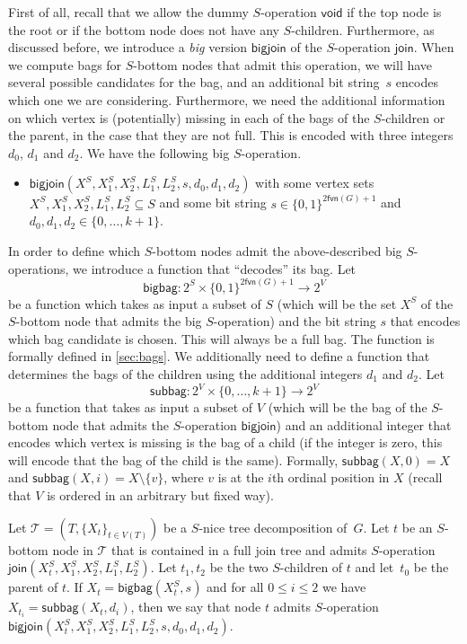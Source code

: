 \documentclass[a4paper,UKenglish,cleveref, autoref, thm-restate, numberwithinsect]{lipics-v2021}
\newcommand{\fvn}{\mathsf{fvn}}
\newcommand{\join}{\mathsf{join}}
\newcommand{\bigjoin}{\mathsf{bigjoin}}
\newcommand{\void}{\mathsf{void}}
\newcommand{\bigbag}{\mathsf{bigbag}}
\newcommand{\subbag}{\mathsf{subbag}}
\newcommand{\slim}{\text{slim}\xspace}
\begin{document}
First of all, recall that we allow the dummy $S$-operation $\void$ if the top node is the root or if the bottom node does not have any $S$-children.
Furthermore, as discussed before, we introduce a \emph{big} version $\bigjoin$ of the $S$-operation $\join$. When we compute bags for $S$-bottom nodes that admit this operation, we will have several possible candidates for the bag, and an additional bit string~$s$ encodes which one we are considering. Furthermore, we need the additional information on which vertex is (potentially) missing in each of the bags of the $S$-children or the parent, in the case that they are not full. This is encoded with three integers $d_0$, $d_1$ and $d_2$. We have the following big $S$-operation.
\begin{itemize}
    \item $\bigjoin(X^S,X_1^S,X_2^S,L_{1}^S, L_{2}^S,s,d_0,d_1,d_2)$ with some vertex sets $X^S,X_1^S,X_2^S,L_1^S,L_2^S\subseteq S$ 
    and some bit string $s\in\{0,1\}^{2\fvn(G)+1}$ and $d_0,d_1,d_2\in\{0,\ldots,k+1\}$. 
\end{itemize}
In order to define which $S$-bottom nodes admit the above-described big $S$-operations, we introduce a function that ``decodes'' its bag. Let
\[
\bigbag : 2^S\times \{0,1\}^{2\fvn(G)+1} \rightarrow 2^V
\]
be a function which takes as input a subset of $S$ (which will be the set $X^S$ of the $S$-bottom node that admits the big $S$-operation) and the bit string $s$ that encodes which bag candidate is chosen.
This will always be a full bag. The function is formally defined in \cref{sec:bags}.
We additionally need to define a function that determines the bags of the children using the additional integers $d_1$ and $d_2$. Let
\[
\subbag : 2^V\times \{0,\ldots,k+1\}\rightarrow 2^V
\]
be a function that takes as input a subset of $V$ (which will be the bag of the $S$-bottom node that admits the $S$-operation $\bigjoin$) and an additional integer that encodes which vertex is missing is the bag of a child (if the integer is zero, this will encode that the bag of the child is the same).
Formally, $\subbag(X,0)=X$ and $\subbag(X,i)=X\setminus\{v\}$, where $v$ is at the $i$th ordinal position in $X$ (recall that $V$ is ordered in an arbitrary but fixed way). 
\begin{definition}[$\bigjoin$]\label{def:bigjoin}
Let $\mathcal{T}=(T,\{X_t\}_{t\in V(T)})$ be a \slim $S$-nice tree decomposition of~$G$. Let $t$ be an $S$-bottom node in $\mathcal{T}$ that is contained in a full join tree and admits $S$-operation $\join(X^S_t,X_1^S,X_2^S,L_{1}^S, L_{2}^S)$. Let $t_1,t_2$ be the two $S$-children of $t$ and let~$t_0$ be the parent of $t$. If $X_t=\bigbag(X^S_t, s)$ and for all $0\le i\le 2$ we have $X_{t_i}=\subbag(X_t,d_i)$, then we say that node $t$ admits $S$-operation $\bigjoin(X^S_t,X_1^S,X_2^S,L_{1}^S, L_{2}^S,s,d_0,d_1,d_2)$.
\end{definition}
\end{document}
